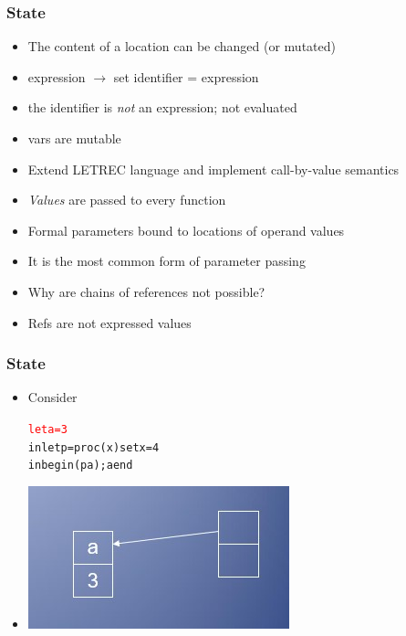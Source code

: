 \documentclass{beamer}
\newcommand{\arrow}{\(\rightarrow\)}
\begin{document}
\begin{frame}[fragile]
\frametitle{State}
\begin{scriptsize}
\begin{itemize}
\item<1-> The content of a location can be changed (or mutated)
	
\item<1-> expression \arrow{} set identifier = expression

\item<1-> the identifier is \emph{not} an expression; not evaluated

\item<1-> vars are mutable

\item<2-> Extend LETREC language and implement call-by-value semantics

\item<2-> \emph{Values} are passed to every function

\item<2-> Formal parameters bound to locations of operand values

\item<2-> It is the most common form of parameter passing

\item<3-> Why are chains of references not possible?

\item<4-> Refs are not expressed values

\end{itemize}
\end{scriptsize}
\end{frame}

\begin{frame}[fragile]
\frametitle{State}
\begin{scriptsize}
\begin{itemize}
\item<1-> Consider
\begin{alltt}
\textcolor{red}{let a = 3}
in let p = proc (x) set x = 4
   in begin (p a); a end
\end{alltt}

\item<2->
\begin{center}
\includegraphics[scale=0.5]{cbv1.jpg}
\end{center}

\end{itemize}
\end{scriptsize}
\end{frame}
\end{document}
